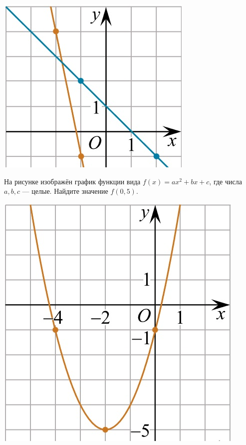 \begin{homework}[number=2]
\begin{listofex}
\begin{minipage}[c]{0.25\textwidth}
			\includegraphics[width=\textwidth]{pics/G101M4H2-3.jpg}
		\end{minipage}
		\item
		\begin{minipage}[t]{0.67\textwidth}
			На рисунке изображён график функции вида \(f(x)=ax^2+bx+c\), где числа \(a, b, c\) --- целые. Найдите значение \(f(0,5)\).
		\end{minipage}
		\begin{minipage}[c]{0.25\textwidth}
			\includegraphics[width=\textwidth]{pics/G101M4H2-4.jpg}

\end{minipage}
\end{listofex}
\end{homework}
